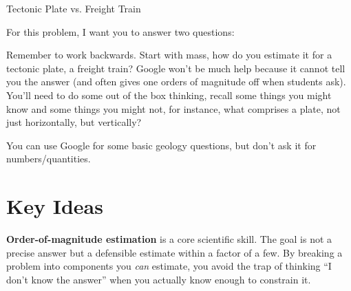 \begin{activity}{Tectonic Plate vs. Freight Train}
\begin{questions}
        For this problem, I want you to answer two questions:

        Remember to work backwards. Start with mass, how do you estimate it for a tectonic plate, a freight train?  Google won't be much help because it cannot tell you the answer (and often gives one orders of magnitude off when students ask).  You'll need to do some out of the box thinking, recall some things you might know and some things you might not, for instance, what comprises a plate, not just horizontally, but vertically?

        You can use Google for some basic geology questions, but don't ask it for numbers/quantities.
\end{questions}


\section*{Key Ideas}

\textbf{Order-of-magnitude estimation} is a core scientific skill. The goal is not a precise answer but a defensible estimate within a factor of a few. By breaking a problem into components you \emph{can} estimate, you avoid the trap of thinking ``I don't know the answer'' when you actually know enough to constrain it.

\begin{minipage}[t]{0.38\textwidth}
    \centering

    \begin{tikzpicture}[
            >=latex,
            node distance=0.8cm,
            process/.style={
                rectangle,
                rounded corners,
                draw,
                align=center,
                minimum width=3.2cm,
                minimum height=0.75cm,
                font=\small
            },
            decision/.style={
                diamond,
                draw,
                aspect=2,
                align=center,
                font=\small,
                inner sep=1pt
            },
            baseline=(current bounding box.north)
        ]


\end{tikzpicture}
\end{minipage}
\end{activity}
